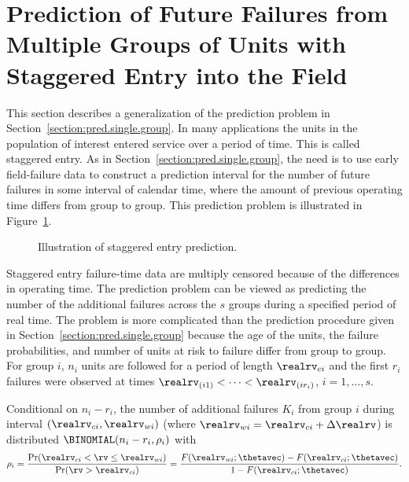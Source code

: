 \section{Prediction of Future Failures from Multiple Groups
of Units with Staggered Entry into the Field }
\label{section:pred.multiple.groups}
This section describes a generalization of the prediction problem in
Section~\ref{section:pred.single.group}. In many applications the
units in the population of interest entered service over a period of
time. This is called staggered entry.  As in
Section~\ref{section:pred.single.group}, the need is to use early
field-failure data to construct a prediction interval for the
number of future failures in some interval of calendar time, where the
amount of previous operating time differs from group to group. This prediction
problem is illustrated in Figure~\ref{figure:staggeredentryfig.ps}.
\begin{figure}
\caption{Illustration of staggered entry prediction.}
\label{figure:staggeredentryfig.ps}
\end{figure}
Staggered entry failure-time data are multiply censored because of
the differences in operating time.  The prediction problem can be
viewed as predicting the number of the additional failures across
the $s$ groups during a specified period of real time. The problem
is more complicated than the prediction procedure given in
Section~\ref{section:pred.single.group} because the age of the
units,
the failure
probabilities, and number of units at risk to failure differ from group
to group.  For group $i$, $n_{i}$ units are followed for a period of
length $\realrv_{ci}$ and the first $r_{i}$ failures were observed
at times $\realrv_{(i1)}< \dots <
\realrv_{(ir_{i})}$, $i=1,\dots, s.$

Conditional on $n_{i}-r_{i}$, the number of additional failures $K_{i}$
from group $i$ during interval $(\realrv_{ci}, \realrv_{wi})$ (where
$\realrv_{wi}=\realrv_{ci}+\Delta \realrv$) is distributed
$\BINOMIAL(n_{i}-r_{i}, \rho_{i})$ with
\begin{equation}
\label{equation:rho.stagger}
	\rho_{i} =\frac{\Pr(\realrv_{ci} < \rv \leq \realrv_{wi})}
{\Pr( \rv >\realrv_{ci} )}
=\frac{F(\realrv_{wi};\thetavec)-F(\realrv_{ci};\thetavec)}
{1 - F(\realrv_{ci};\thetavec)}.
\end{equation}


